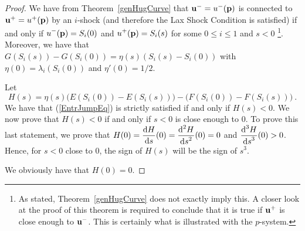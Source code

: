 \begin{proof}
We have from Theorem~\ref{genHugCurve} that
$\mathbf{u}^- = u^-(\mathbf{p})$ is connected to $\mathbf{u}^+ = u^+(\mathbf{p})$ 
by an $i$-shock (and therefore the Lax Shock Condition is satisfied)
if and only if $\displaystyle u^-(\mathbf{p}) = S_i(0)$ and
$\displaystyle u^+(\mathbf{p}) = S_i(s)$ for some $0 \leq i \leq 1$
and $s<0$ \footnote{As stated, Theorem~\ref{genHugCurve} does not
exactly imply this.  A closer look at the proof of this theorem is
required to conclude that it is true if $\mathbf{u}^+$ is close enough to
$\mathbf{u}^-$.  This is certainly what is illustrated with the
$p$-system.}.  Moreover, we have that
$\displaystyle G(S_i(s))-G(S_i(0))
= \eta(s) \left(S_i(s) - S_i(0)\right)$
with $\displaystyle \eta(0) = \lambda_i(S_i(0))$ and $\eta'(0) = 1/2$.

Let
\[
  H(s) = \eta(s) \big( E(S_i(0)) - E(S_i(s)) \big)
  - \big( F(S_i(0))- F(S_i(s)) \big) \ .
\]
We have that (\ref{EntrJumpEq}) is strictly satisfied if and only if
$H(s) < 0$.  We now prove that $H(s) <0$ if and only if $s<0$ is close
enough to $0$.  To prove this last statement, we prove that
$\displaystyle H(0) = \frac{\mathrm{d}H}{\mathrm{d}{s}}(0) = \frac{\displaystyle \mathrm{d}^{2}{H}} {\displaystyle \mathrm{d}{s}^{2}}(0) = 0$ and
$\displaystyle \frac{\displaystyle \mathrm{d}^{3}{H}} {\displaystyle \mathrm{d}{s}^{3}}(0) > 0$.
Hence, for $s<0$ close to $0$, the sign of $H(s)$ will be the sign of
$s^3$.

We obviously have that $H(0) = 0$.


\end{proof}

